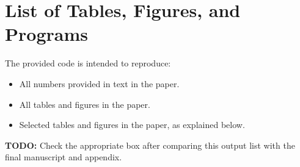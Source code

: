 \documentclass[11pt]{article}
\newcommand{\todo}[1]{\textbf{TODO:} #1}
\begin{document}
\section*{List of Tables, Figures, and Programs}

The provided code is intended to reproduce:

\begin{itemize}
  \item[$\rlap{$\checkmark$}\square$] All numbers provided in text in the paper.
  \item[$\rlap{$\checkmark$}\square$] All tables and figures in the paper.
  \item[$\square$] Selected tables and figures in the paper, as explained below.
\end{itemize}

\todo{Check the appropriate box after comparing this output list with the final manuscript and appendix.}
\end{document}

